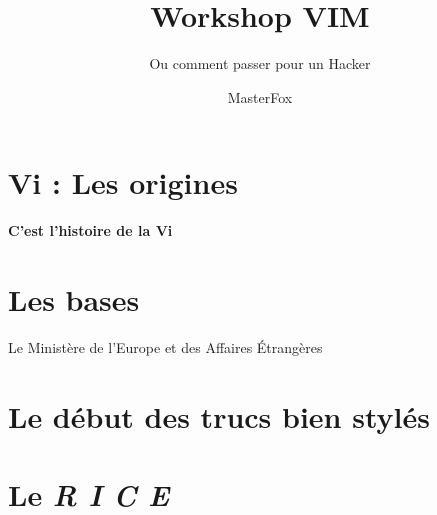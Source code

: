 \documentclass[10pt]{beamer}
\title{Workshop VIM}
\subtitle{Ou comment passer pour un Hacker}
\author{MasterFox}
\begin{document}
	  \maketitle

		\section{Vi : Les origines}
			\begin{frame}{\textbf{C'est l'histoire de la Vi}}

			\end{frame}

		\section{Les bases}
			\begin{frame}{Le Ministère de l'Europe et des Affaires Étrangères}
			\end{frame}

		\section{Le début des trucs bien stylés}
		\section{Le \textit{R I C E}}
\end{document}
